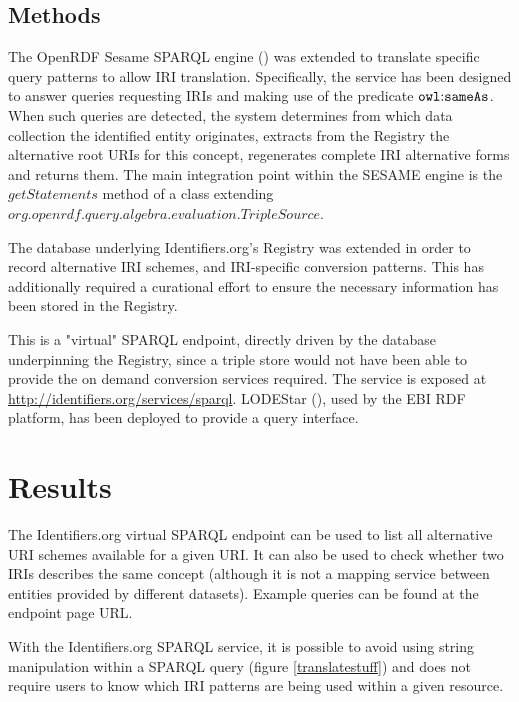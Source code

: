 \documentclass{bioinfo}
\begin{document}
\begin{methods}
\section{Methods}
The OpenRDF Sesame SPARQL engine (\cite{SESAME}) was extended to translate specific query patterns to allow IRI translation. Specifically, the service has been designed to answer queries requesting IRIs and making use of the predicate $\mathtt{owl\text{\rm :}{}sameAs}$.  When such queries are detected, the system determines from which data collection the identified entity originates, extracts from the Registry the alternative root URIs for this concept, regenerates complete IRI alternative forms and returns them. The main integration point within the SESAME engine is the $getStatements$ method of a class extending $org.openrdf.query.algebra.evaluation.TripleSource$.

The database underlying Identifiers.org's Registry was extended in order to record alternative IRI schemes, and IRI-specific conversion patterns. This has additionally required a curational effort to ensure the necessary information has been stored in the Registry.

This is a "virtual" SPARQL endpoint, directly driven by the database underpinning the Registry, since a triple store would not have been able to provide the on demand conversion services required. The service is exposed at \href{http://identifiers.org/services/sparql}{http://identifiers.org/services/sparql}. LODEStar (\cite{LODEStar}), used by the EBI RDF platform, has been deployed to provide a query interface.
\end{methods}


\section{Results}
The Identifiers.org virtual SPARQL endpoint can be used to list all alternative URI schemes available for a given URI. It can also be used to check whether two IRIs describes the same concept (although it is not a mapping service between entities provided by different datasets). Example queries can be found at the endpoint page URL.

With the Identifiers.org SPARQL service, it is possible to avoid using string manipulation within a SPARQL query (figure \ref{translatestuff}) and does not require users to know which IRI patterns are being used within a given resource.
\end{document}
